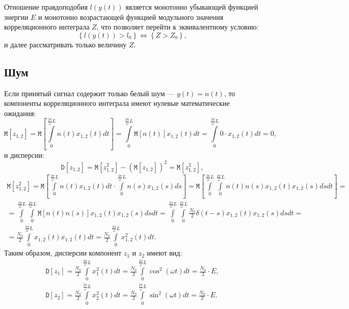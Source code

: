 \documentclass[a4paper,12pt]{article}
\newcommand{\expectation}[1]{\mathtt{M} \left [ #1 \right ]}
\newcommand{\variance}[1]{\mathtt{D} \left [ #1 \right ]}
\begin{document}
    Отношение правдоподобия $l(y(t))$ является монотонно убывающей функцией энергии $E$ и монотонно возрастающей функцией модульного значения корреляционного интеграла $Z$,
    что позволяет перейти к эквивалентному условию:
    \[
        \left \{ l(y(t)) > l_0 \right \} \Leftrightarrow \left \{ Z > Z_0 \right \} ,
    \]
    и далее рассматривать только величину $Z$.

    \subsection{Шум}

    Если принятый сигнал содержит только белый шум --- $y(t) = n(t)$, то компоненты корреляционного интеграла имеют нулевые математические ожидания:
    \[
        \expectation{z_{1,2}}
        = \expectation{\int \limits_{0}^{\frac{2 \pi}{\omega}L} n(t) x_{1,2}(t) dt}
        = \int \limits_{0}^{\frac{2 \pi}{\omega}L} \expectation{n(t)} x_{1,2}(t) dt
        = \int \limits_{0}^{\frac{2 \pi}{\omega}L} 0 \cdot x_{1,2}(t) dt
        = 0 ,
    \]
    и дисперсии:
    \begin{equation}
        \label{equation:signal_model:noise:variance}
        \variance{z_{1,2}}
        = \expectation{z_{1,2}^2} - \left ( \expectation{z_{1,2}} \right )^{2}
        = \expectation{z_{1,2}^2},
    \end{equation}
    \begin{multline}
        \label{equation:signal_model:noise:squared_moment}
        \expectation{z_{1,2}^2}
        = \expectation{\int \limits_{0}^{\frac{2 \pi}{\omega}L} n(t) x_{1,2}(t) dt \cdot \int \limits_{0}^{\frac{2 \pi}{\omega}L} n(s) x_{1,2}(s) ds}
        = \expectation{\int \limits_{0}^{\frac{2 \pi}{\omega}L} \int \limits_{0}^{\frac{2 \pi}{\omega}L} n(t) n(s) x_{1,2}(t) x_{1,2}(s) ds dt} = \\
%
        = \int \limits_{0}^{\frac{2 \pi}{\omega}L} \int \limits_{0}^{\frac{2 \pi}{\omega}L} \expectation{n(t) n(s)} x_{1,2}(t) x_{1,2}(s) ds dt
        = \int \limits_{0}^{\frac{2 \pi}{\omega}L} \int \limits_{0}^{\frac{2 \pi}{\omega}L} \frac{N_0}{2} \delta (t-s) x_{1,2}(t) x_{1,2}(s) ds dt = \\
        = \frac{N_0}{2} \int \limits_{0}^{\frac{2 \pi}{\omega}L} x_{1,2}(t) x_{1,2}(t) dt
        = \frac{N_0}{2} \int \limits_{0}^{\frac{2 \pi}{\omega}L} x_{1,2}^2(t) dt .
    \end{multline}
    Таким образом, дисперсии компонент $z_1$ и $z_2$ имеют вид:
    \begin{gather*}
        \variance{z_1}
        = \frac{N_0}{2} \int \limits_{0}^{\frac{2 \pi}{\omega}L} x_1^2(t) dt
        = \frac{N_0}{2} \int \limits_{0}^{\frac{2 \pi}{\omega}L} \cos^2(\omega t) dt
        = \frac{N_0}{2} \cdot E, \\
        \variance{z_2}
        = \frac{N_0}{2} \int \limits_{0}^{\frac{2 \pi}{\omega}L} x_2^2(t) dt
        = \frac{N_0}{2} \int \limits_{0}^{\frac{2 \pi}{\omega}L} \sin^2(\omega t) dt
        = \frac{N_0}{2} \cdot E .
    \end{gather*}
\end{document}
